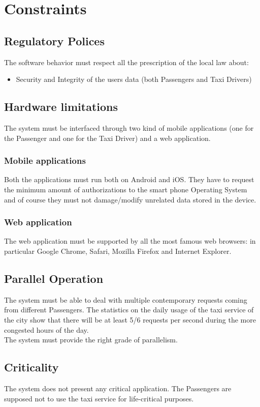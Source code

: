 \section{Constraints}
\subsection{Regulatory Polices}
The software behavior must respect all the prescription of the local law about:
\begin{itemize}
\item Security and Integrity of the users data (both Passengers and Taxi Drivers)
\end{itemize}
\subsection{Hardware limitations}
The system must be interfaced through two kind of mobile applications (one for the Passenger and one for the Taxi Driver) and a web application.
\subsubsection{Mobile applications}
Both the applications must run both on Android and iOS. They have to request the minimum amount of authorizations to the smart phone Operating System and of course they must not damage/modify unrelated data stored in the device.
\subsubsection{Web application}
The web application must be supported by all the most famous web browsers: in particular Google Chrome, Safari, Mozilla Firefox and Internet Explorer.
\subsection{Parallel Operation}
The system must be able to deal with multiple contemporary requests coming from different Passengers. The statistics on the daily usage of the taxi service of the city show that there will be at least 5/6 requests per second during the more congested hours of the day.\\
The system must provide the right grade of parallelism.
\subsection{Criticality}
The system does not present any critical application. The Passengers are supposed not to use the taxi service for life-critical purposes.